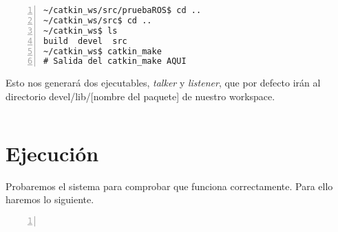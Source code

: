 	\begin{lstlisting}[style=consola,numbers=left]
~/catkin_ws/src/pruebaROS$ cd ..
~/catkin_ws/src$ cd ..
~/catkin_ws$ ls
build  devel  src
~/catkin_ws$ catkin_make
# Salida del catkin_make AQUI
	\end{lstlisting}
	
	Esto nos generará dos ejecutables, \emph{talker} y \emph{listener}, que por defecto irán al directorio devel/lib/[nombre del paquete] de nuestro workspace.
	
	\begin{lstlisting}[style=consola,numbers=left]

	\end{lstlisting}
	
	\section{Ejecución}
	Probaremos el sistema para comprobar que funciona correctamente. Para ello haremos lo siguiente.
	
	\begin{lstlisting}[style=consola,numbers=left]
	
	\end{lstlisting}